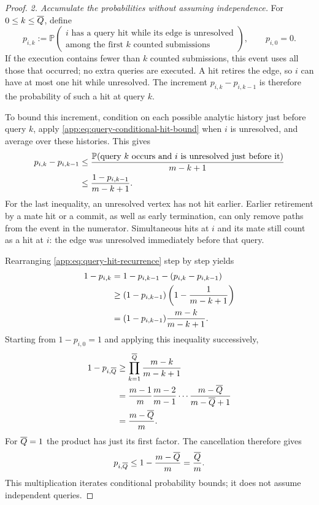 \begin{proof}
\emph{2. Accumulate the probabilities without assuming independence.}
For \(0\le k\le\overline Q{}\), define
\[
 p_{i,k}:=
 \mathbb P\!\left(
 \begin{gathered}
 i\text{ has a query hit while its edge is unresolved}\\
 \text{among the first }k\text{ counted submissions}
 \end{gathered}
 \right),
 \qquad p_{i,0}=0.
\]
If the execution contains fewer than \(k\) counted submissions, this event
uses all those that occurred; no extra queries are executed.
A hit retires the edge, so \(i\) can have at most one hit while unresolved.
The increment \(p_{i,k}-p_{i,k-1}\) is therefore the probability of such
a hit at query \(k\).

To bound this increment, condition on each possible analytic history
just before query \(k\), apply
\eqref{app:eq:query-conditional-hit-bound} when \(i\) is unresolved,
and average over these histories. This gives
\begin{align}
 p_{i,k}-p_{i,k-1}
 &\le
 \frac{\mathbb P(\text{query }k\text{ occurs and }i
                  \text{ is unresolved just before it})}
      {m-k+1}\notag\\
 &\le\frac{1-p_{i,k-1}}{m-k+1}.
 \label{app:eq:query-hit-recurrence}
\end{align}
For the last inequality, an unresolved vertex has not hit earlier.
Earlier retirement by a mate hit or a commit, as well as early termination,
can only remove paths from the event in the numerator.
Simultaneous hits at \(i\) and its mate still count as a hit at \(i\):
the edge was unresolved immediately before that query.

Rearranging \eqref{app:eq:query-hit-recurrence} step by step yields
\begin{align*}
 1-p_{i,k}
 &=1-p_{i,k-1}-(p_{i,k}-p_{i,k-1})\\
 &\ge(1-p_{i,k-1})
       \left(1-\frac1{m-k+1}\right)\\
 &=(1-p_{i,k-1})
       \frac{m-k}{m-k+1}.
\end{align*}
Starting from \(1-p_{i,0}=1\) and applying this inequality successively,
\begin{align*}
 1-p_{i,\overline Q{}}
 &\ge
 \prod_{k=1}^{\overline Q{}}
       \frac{m-k}{m-k+1}\\
 &=\frac{m-1}{m}
   \frac{m-2}{m-1}\cdots
   \frac{m-\overline Q{}}
        {m-\overline Q{}+1}\\
 &=\frac{m-\overline Q{}}{m}.
\end{align*}
For \(\overline Q{}=1\) the product has just its first factor.
The cancellation therefore gives
\begin{equation}
 p_{i,\overline Q{}}
 \le 1-\frac{m-\overline Q{}}{m}
 =\frac{\overline Q{}}{m}.
 \label{app:eq:query-source-hit-bound}
\end{equation}
This multiplication iterates conditional probability bounds; it does not
assume independent queries.


\end{proof}
